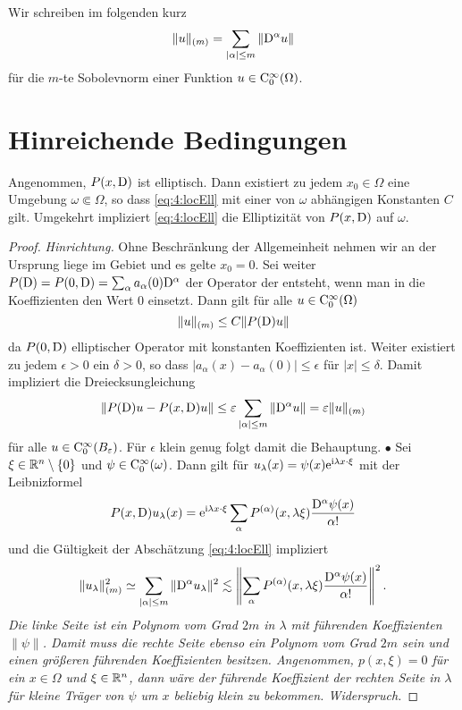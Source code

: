 Wir schreiben im folgenden kurz 
\begin{equation}
    \|u\|_{(m)} = \sum_{|\alpha|\le m} \|\mathrm D^\alpha u\|
\end{equation}
für die $m$-te Sobolevnorm einer Funktion $u\in\mathrm C_0^\infty(\Omega)$. 

\section{Hinreichende Bedingungen}
\cite{Hormander:1955}

\begin{thm}
Angenommen, $P(x,\mathrm D)$ ist elliptisch. Dann existiert zu jedem $x_0\in\Omega$ eine Umgebung $\omega\Subset\Omega$, so dass
\eqref{eq:4:locEll} mit einer von $\omega$ abhängigen Konstanten $C$ gilt. Umgekehrt impliziert \eqref{eq:4:locEll} die Elliptizität von $P(x,\mathrm D)$ auf $\omega$.
\end{thm}
\begin{proof}{\em Hinrichtung.}
Ohne Beschränkung der Allgemeinheit nehmen wir an der Ursprung liege im Gebiet und es gelte $x_0=0$. Sei weiter $P(\mathrm D)=P(0,\mathrm D)=\sum_\alpha a_\alpha(0)\mathrm D^\alpha$ der Operator der entsteht, wenn man in die Koeffizienten den Wert $0$ einsetzt. Dann gilt für alle $u\in\mathrm C_0^\infty(\Omega)$
\begin{equation}
 \|u\|_{(m)} \le C  \| P(\mathrm D) u\| 
\end{equation}
da $P(0,\mathrm D)$ elliptischer Operator mit konstanten Koeffizienten ist. Weiter existiert zu jedem $\epsilon>0$ ein $\delta>0$, so dass
$|a_\alpha(x)-a_\alpha(0)|\le \epsilon$ für $|x|\le\delta$. Damit impliziert die Dreiecksungleichung
\begin{equation}
  \| P(\mathrm D) u - P(x,\mathrm D) u\| \le \varepsilon \sum_{|\alpha|\le m} \|\mathrm D^\alpha u\| = \varepsilon \|u\|_{(m)}
\end{equation}
für alle $u\in\mathrm C_0^\infty(B_\varepsilon)$. Für $\epsilon$ klein genug folgt damit die Behauptung. $\bullet$ Sei $\xi\in\mathbb R^n\setminus\{0\}$ und 
$\psi\in\mathrm C_0^\infty(\omega)$. Dann gilt für $u_\lambda (x)=\psi(x) \mathrm e^{\mathrm i \lambda x\cdot\xi}$ mit der Leibnizformel
\begin{equation}
    P(x,\mathrm D) u_\lambda (x) = \mathrm e^{\mathrm i \lambda x\cdot \xi} \sum_\alpha P^{(\alpha)}(x,\lambda\xi) \frac{ \mathrm D^\alpha\psi(x)}{\alpha!}
\end{equation}
und die Gültigkeit der Abschätzung  \eqref{eq:4:locEll}  impliziert
\begin{equation}
    \| u_\lambda\|_{(m)}^2 \simeq \sum_{|\alpha|\le m} \| \mathrm D^\alpha u_\lambda\|^2 \lesssim \left\| \sum_\alpha P^{(\alpha)}(x,\lambda\xi) \frac{ \mathrm D^\alpha\psi(x)}{\alpha!} \right\|^2. 
\end{equation}
{\sl Die linke Seite ist ein Polynom vom Grad $2m$ in $\lambda$ mit führenden Koeffizienten $\|\psi\|$. Damit muss die rechte Seite ebenso ein Polynom vom Grad $2m$ sein und einen größeren führenden Koeffizienten besitzen. Angenommen, $p(x,\xi)=0$ für ein $x\in\Omega$ und $\xi\in\mathbb R^n$, dann wäre der führende Koeffizient der rechten Seite in $\lambda$ für kleine Träger von $\psi$ um $x$ beliebig klein zu bekommen. Widerspruch.}
\end{proof}

